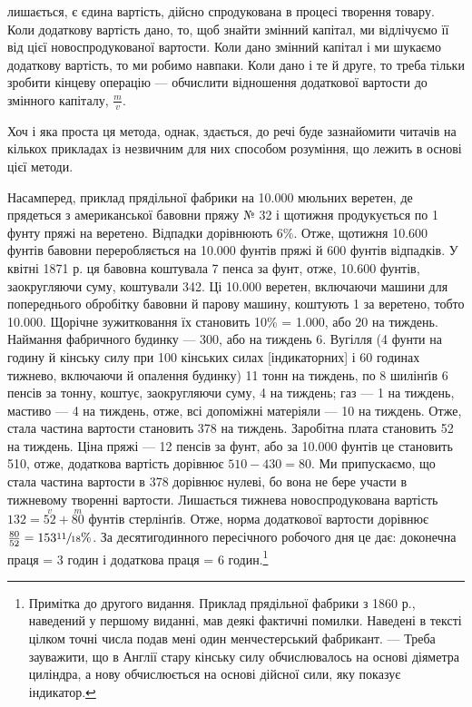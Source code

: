 \parcont{}  %
лишається, є єдина вартість, дійсно спродукована в процесі творення товару. Коли додаткову вартість
дано, то, щоб знайти змінний капітал, ми відлічуємо її від цієї новоспродукованої вартости.
Коли дано змінний капітал і ми шукаємо додаткову вартість, то ми робимо навпаки. Коли дано і те й
друге, то треба тільки зробити кінцеву операцію — обчислити відношення додаткової вартости до
змінного капіталу, $\frac{m}{v}$.

Хоч і яка проста ця метода, однак, здається, до речі буде зазнайомити читачів на кількох прикладах
із незвичним для них
способом розуміння, що лежить в основі цієї методи.

Насамперед, приклад прядільної фабрики на \num{10.000} мюльних веретен, де прядеться з американської
бавовни пряжу № 32 і
щотижня продукується по 1 фунту пряжі на веретено. Відпадки дорівнюють 6\%. Отже, щотижня \num{10.600}
фунтів бавовни переробляється на \num{10.000} фунтів пряжі й 600 фунтів відпадків. У квітні 1871 р. ця
бавовна коштувала 7 пенса за фунт, отже, \num{10.600} фунтів, заокругляючи суму, коштували 342. Ці \num{10.000}
веретен, включаючи машини для попереднього обробітку бавовни й парову машину, коштують 1 за веретено, тобто \num{10.000}. Щорічне зужитковання їх становить
10\% = \num{1.000}, або 20 на тиждень. Наймання фабричного будинку —
300, або на тиждень 6. Вугілля (4 фунти на годину
й кінську силу при 100 кінських силах [індикаторних] і 60 годинах тижнево, включаючи й опалення
будинку) 11 тонн
на тиждень, по 8 шилінґів 6 пенсів за тонну, коштує, заокругляючи суму, 4 на
тиждень; газ — 1 на тиждень, мастиво — 4 на тиждень, отже, всі
допоміжні матеріяли — 10 на тиждень. Отже, стала частина вартости становить 378
на тиждень. Заробітна плата становить 52 на тиждень. Ціна пряжі — 12 пенсів за
фунт, або за \num{10.000} фунтів
це становить 510, отже, додаткова вартість дорівнює $510 - 430 = 80$. Ми припускаємо, що стала частина вартости в 378 дорівнює нулеві, бо
вона не бере участи в тижневому творенні вартости.
Лишається тижнева новоспродукована вартість $132 = \overset{v}{52} + \overset{m}{80}$ фунтів стерлінґів. Отже, норма
додаткової вартости дорівнює
$\frac{80}{52} = 153\sfrac{11}{18}\%$. За десятигодинного пересічного робочого дня це дає: доконечна праця = 3
годин і додаткова праця = 6 годин.\footnote{
Примітка до другого видання. Приклад прядільної фабрики з 1860 р., наведений у першому виданні,
мав деякі фактичні помилки. Наведені в тексті цілком точні числа подав мені один менчестерський
фабрикант. — Треба зауважити, що в Англії стару кінську силу обчислювалось
на основі діяметра циліндра, а нову обчислюється на основі дійсної сили, яку показує індикатор.
}
